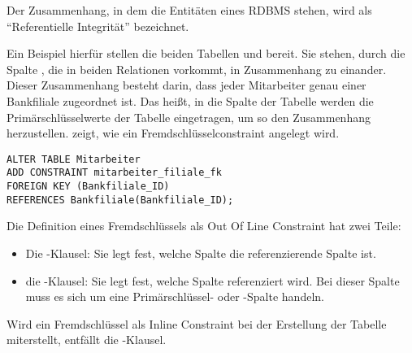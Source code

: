        \begin{merke}
          Der Zusammenhang, in dem die Entitäten eines RDBMS stehen, wird als \enquote{Referentielle Integrität} bezeichnet.
        \end{merke}
        Ein Beispiel hierfür stellen die beiden Tabellen  und  bereit. Sie stehen, durch die Spalte , die in beiden Relationen vorkommt, in Zusammenhang zu einander. Dieser Zusammenhang besteht darin, dass jeder Mitarbeiter genau einer Bankfiliale zugeordnet ist. Das heißt,  in die Spalte  der Tabelle  werden die Primärschlüsselwerte der Tabelle  eingetragen, um so den Zusammenhang herzustellen.
         zeigt, wie ein Fremdschlüsselconstraint angelegt wird.
\clearpage
        \begin{lstlisting}[language=oracle_sql,caption={Ein Foreign Key-Constraint als Out Of Line Constraint anlegen},label=sql09_15]
ALTER TABLE Mitarbeiter
ADD CONSTRAINT mitarbeiter_filiale_fk
FOREIGN KEY (Bankfiliale_ID)
REFERENCES Bankfiliale(Bankfiliale_ID);
        \end{lstlisting}
        Die Definition eines Fremdschlüssels als Out Of Line Constraint hat zwei Teile:
        \begin{itemize}
          \item Die -Klausel: Sie legt fest, welche Spalte die referenzierende Spalte ist.
          \item die -Klausel: Sie legt fest, welche Spalte referenziert wird. Bei dieser Spalte muss es sich um eine Primärschlüssel- oder \UNIQUE-Spalte handeln.
        \end{itemize}
        \begin{merke}
          Wird ein Fremdschlüssel als Inline Constraint bei der Erstellung der Tabelle miterstellt, entfällt die -Klausel.
        \end{merke}
